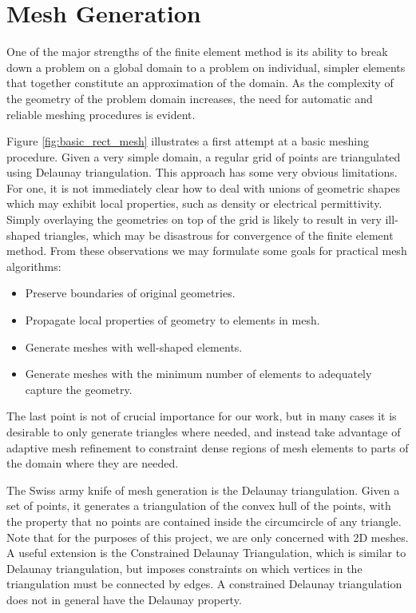 \documentclass[10pt,a4paper]{article}
\begin{document}
\section*{Mesh Generation}
One of the major strengths of the finite element method is its ability to break down a problem on a global domain to a problem on individual, simpler elements that together constitute an approximation of the domain. As the complexity of the geometry of the problem domain increases, the need for automatic and reliable meshing procedures is evident. 

Figure \ref{fig:basic_rect_mesh} illustrates a first attempt at a basic meshing procedure. Given a very simple domain, a regular grid of points are triangulated using Delaunay triangulation. This approach has some very obvious limitations. For one, it is not immediately clear how to deal with unions of geometric shapes which may exhibit local properties, such as density or electrical permittivity. Simply overlaying the geometries on top of the grid is likely to result in very ill-shaped triangles, which may be disastrous for convergence of the finite element method. From these observations we may formulate some goals for practical mesh algorithms:

\begin{itemize}
  \item Preserve boundaries of original geometries.
  \item Propagate local properties of geometry to elements in mesh.
  \item Generate meshes with well-shaped elements.
  \item Generate meshes with the minimum number of elements to adequately capture the geometry.
\end{itemize}

The last point is not of crucial importance for our work, but in many cases it is desirable to only generate triangles where needed, and instead take advantage of adaptive mesh refinement to constraint dense regions of mesh elements to parts of the domain where they are needed.

The Swiss army knife of mesh generation is the Delaunay triangulation. Given a set of points, it generates a triangulation of the convex hull of the points, with the property that no points are contained inside the circumcircle of any triangle. Note that for the purposes of this project, we are only concerned with 2D meshes. A useful extension is the Constrained Delaunay Triangulation, which is similar to Delaunay triangulation, but imposes constraints on which vertices in the triangulation must be connected by edges. A constrained Delaunay triangulation does not in general have the Delaunay property.
\end{document}
